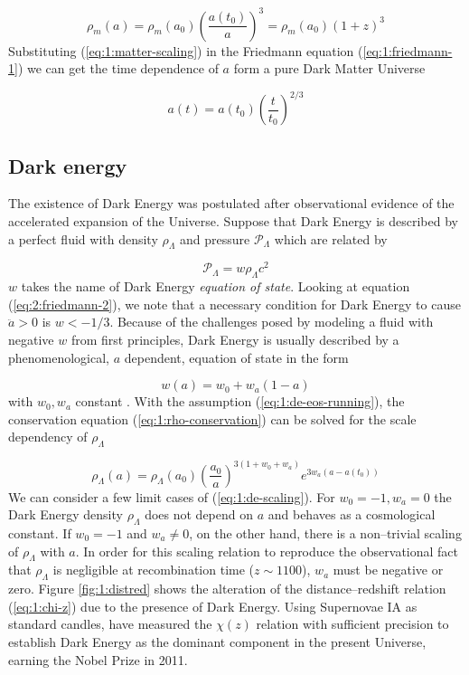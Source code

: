 \begin{equation}
\label{eq:1:matter-scaling}
\rho_m(a) = \rho_m(a_0)\left(\frac{a(t_0)}{a}\right)^3 = \rho_m(a_0)(1+z)^3 
\end{equation} 
%
Substituting (\ref{eq:1:matter-scaling}) in the Friedmann equation (\ref{eq:1:friedmann-1}) we can get the time dependence of $a$ form a pure Dark Matter Universe

\begin{equation}
\label{eq:1:matter-only-a}
a(t) = a(t_0)\left(\frac{t}{t_0}\right)^{2/3}
\end{equation}

\subsection{Dark energy}
The existence of Dark Energy was postulated after observational evidence of the accelerated expansion of the Universe. Suppose that Dark Energy is described by a perfect fluid with density $\rho_\Lambda$ and pressure $\mathcal{P}_\Lambda$ which are related by

\begin{equation}
\label{eq:1:de-eos}
\mathcal{P}_\Lambda = w\rho_\Lambda c^2
\end{equation}
%
$w$ takes the name of Dark Energy \textit{equation of state}. Looking at equation (\ref{eq:2:friedmann-2}), we note that a necessary condition for Dark Energy to cause $\ddot{a}>0$ is $w<-1/3$. Because of the challenges posed by modeling a fluid with negative $w$ from first principles, Dark Energy is usually described by a phenomenological, $a$ dependent, equation of state in the form

\begin{equation}
\label{eq:1:de-eos-running}
w(a) = w_0 + w_a(1-a)
\end{equation}
%
with $w_0,w_a$ constant \citep{LinderDE}. With the assumption (\ref{eq:1:de-eos-running}), the conservation equation (\ref{eq:1:rho-conservation}) can be solved for the scale dependency of $\rho_\Lambda$

\begin{equation}
\label{eq:1:de-scaling}
\rho_\Lambda(a) = \rho_\Lambda(a_0)\left(\frac{a_0}{a}\right)^{3(1+w_0+w_a)}e^{3w_a(a-a(t_0))} 
\end{equation}
%
We can consider a few limit cases of (\ref{eq:1:de-scaling}). For $w_0=-1,w_a=0$ the Dark Energy density $\rho_\Lambda$ does not depend on $a$ and behaves as a cosmological constant. If $w_0=-1$ and $w_a\neq 0$, on the other hand, there is a non--trivial scaling of $\rho_\Lambda$ with $a$. In order for this scaling relation to reproduce the observational fact that $\rho_\Lambda$ is negligible at recombination time ($z\sim 1100$), $w_a$ must be negative or zero. Figure \ref{fig:1:distred} shows the alteration of the distance--redshift relation (\ref{eq:1:chi-z}) due to the presence of Dark Energy. Using Supernovae IA as standard candles, \citep{PerlmutterNobel} have measured the $\chi(z)$ relation with sufficient precision to establish Dark Energy as the dominant component in the present Universe, earning the Nobel Prize in 2011.  

